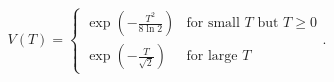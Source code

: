 \begin{equation}\label{V2}
V(T)=\left\{
\begin{array}{ll}
\exp\left(-\frac{T^{2}}{8\ln 2}\right) & \mbox{for small $T$ but $T\ge 0$} \\
\exp\left(-\frac{T}{\sqrt{2}}\right) & \mbox{for large $T$}
\end{array}
.
\right.
\end{equation}

